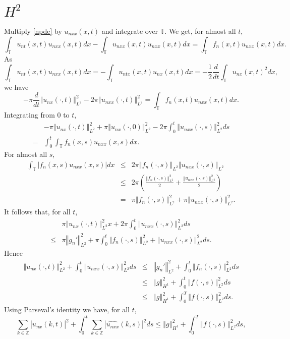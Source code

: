 \documentclass{article}
\newcommand{\norm}[1]{\left\Vert #1 \right\Vert}
\begin{document}
\section{$H^2$}
Multiply \eqref{npde} by $u_{nxx}(x,t)$ and integrate over $\mathbb{T}$. We get, for almost all $t$,
\[
\int_\mathbb{T} u_{nt}(x,t)u_{nxx}(x,t) dx- \int_\mathbb{T} u_{nxx}(x,t) u_{nxx}(x,t) dx = \int_\mathbb{T} f_n(x,t) u_{nxx}(x,t) dx.
\]
As
\[
\int_\mathbb{T} u_{nt}(x,t)u_{nxx}(x,t) dx = -\int_\mathbb{T} u_{ntx}(x,t) u_{nx}(x,t)dx
=-\frac{1}{2} \frac{d}{dt} \int_\mathbb{T} u_{nx}(x,t)^2 dx,
\]
we have
\[
-\pi \frac{d}{dt} \norm{u_{nx}(\cdot,t)}_{L^2}^2-2\pi \norm{u_{nxx}(\cdot,t)}_{L^2}^2=\int_\mathbb{T} f_n(x,t) u_{nxx}(x,t) dx.
\]
Integrating from $0$ to $t$,
\[
\begin{split}
&-\pi \norm{u_{nx}(\cdot,t)}_{L^2}^2+\pi \norm{u_{nx}(\cdot,0)}_{L^2}^2-2\pi \int_0^t \norm{u_{nxx}(\cdot,s)}_{L^2}^2 ds\\
=&
\int_0^t \int_\mathbb{T} f_n(x,s) u_{nxx}(x,s) dx.
\end{split}
\]
For almost all $s$,
\begin{eqnarray*}
\int_\mathbb{T} |f_n(x,s) u_{nxx}(x,s)| dx &\leq&
2\pi \norm{f_n(\cdot,s)}_{L^2} \norm{u_{nxx}(\cdot,s)}_{L^2}\\
&\leq& 2\pi \left(\frac{\norm{f_n(\cdot,s)}_{L^2}^2}{2}+ \frac{\norm{u_{nxx}(\cdot,s)}_{L^2}^2}{2} \right)\\
&=&\pi \norm{f_n(\cdot,s)}_{L^2}^2 + \pi \norm{u_{nxx}(\cdot,s)}_{L^2}^2.
\end{eqnarray*}
It follows that, for all $t$,
\[
\begin{split}
&\pi \norm{u_{nx}(\cdot,t)}_{L^2}^2x  + 2\pi \int_0^t \norm{u_{nxx}(\cdot,s)}_{L^2}^2 ds\\
\leq&\pi \norm{g_n'}_{L^2}^2+\pi \int_0^t \norm{f_n(\cdot,s)}_{L^2}^2 + \norm{u_{nxx}(\cdot,s)}_{L^2}^2 ds.
\end{split}
\]
Hence
\begin{eqnarray*}
\norm{u_{nx}(\cdot,t)}_{L^2}^2 +  \int_0^t \norm{u_{nxx}(\cdot,s)}_{L^2}^2 ds& \leq& \norm{g_n'}_{L^2}^2 + \int_0^t \norm{f_n(\cdot,s)}_{L^2}^2 ds\\
&\leq&\norm{g}_{H^1}^2 +  \int_0^t \norm{f(\cdot,s)}_{L^2}^2 ds\\
&\leq&\norm{g}_{H^1}^2 +  \int_0^T \norm{f(\cdot,s)}_{L^2}^2 ds.
\end{eqnarray*}
Using Parseval's identity we have, for  all $t$,
\[
\sum_{k \in \mathbb{Z}} | \widehat{u_{nx}}(k,t)|^2 + \int_0^t \sum_{k \in \mathbb{Z}} |\widehat{u_{nxx}}(k,s)|^2 ds\leq \norm{g}_{H^1}^2 +  \int_0^T \norm{f(\cdot,s)}_{L^2}^2 ds,
\]
\end{document}
